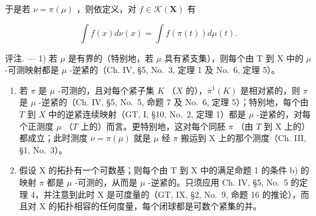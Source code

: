 于是若 \(\nu = \pi (\mu)\) ，则依定义，对 \(f\in \mathcal{K}(\mathbf{X})\) 有

\[
\int f (x) d \nu (x) = \int f (\pi (t)) d \mu (t).\tag{1}
\]

评注. --- 1) 若 \(\mu\) 是有界的（特别地，若 \(\mu\) 具有紧支集），则每个由 T 到 X 中的 \(\mu\) -可测映射都是 \(\mu\) -逆紧的（Ch. IV, §5, No.~3, 定理 1 及 No.~6, 定理 5）。

\begin{enumerate}
\def\labelenumi{\arabic{enumi})}
\setcounter{enumi}{1}
\item
  若 \(\pi\) 是 \(\mu\) -可测的，且对每个紧子集 \(K\) （\(X\) 的），\(\overline{\pi}^{1}(K)\) 是相对紧的，则 \(\pi\) 是 \(\mu\) -逆紧的（Ch. IV, §5, No.~5, 命题 7 及 No.~6, 定理 5）；特别地，每个由 \(T\) 到 \(X\) 中的逆紧连续映射（GT, I, §10, No.~2, 定理 1）都是 \(\mu\) -逆紧的，对每个正测度 \(\mu\) （\(T\) 上的）而言。更特别地，这对每个同胚 \(\pi\) （由 \(T\) 到 X 上的）都成立；此时测度 \(\nu = \pi(\mu)\) 就是 \(\mu\) 经 \(\pi\) 搬运到 X 上的那个测度（Ch. III, §1, No.~3）。
\item
  假设 X 的拓扑有一个可数基；则每个由 T 到 X 中的满足命题 1 的条件 b) 的映射 \(\pi\) 都是 \(\mu\) -可测的，从而是 \(\mu\) -逆紧的。只须应用 Ch. IV, §5, No.~5 的定理 4，并注意到此时 X 是可度量的（GT, IX, §2, No.~9, 命题 16 的推论），而且对 X 的拓扑相容的任何度量，每个闭球都是可数个紧集的并。
\end{enumerate}

